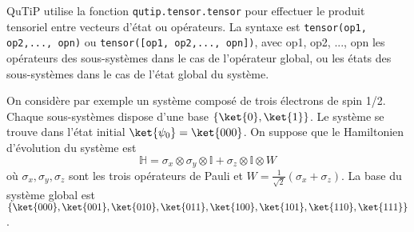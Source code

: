 QuTiP utilise la fonction \texttt{qutip.tensor.tensor} pour effectuer le 
produit tensoriel entre vecteurs d'état ou opérateurs. La syntaxe est 
\texttt{tensor(op1, op2,..., opn)} ou \texttt{tensor([op1, op2,..., opn])}, 
avec op1, op2, ..., opn les opérateurs des sous-systèmes dans le cas 
de l'opérateur global, ou les états des sous-systèmes dans le cas de l'état 
global du système.

On considère par exemple un système composé de trois électrons de spin 1/2. 
Chaque sous-systèmes dispose d'une base $\{\ket{0},\ket{1}\}$. Le système se 
trouve dans l'état initial $\ket{\psi_0}=\ket{000}$. On suppose que le 
Hamiltonien d'évolution du système est 
\begin{equation}
\mathbb{H} = 
\sigma_x\otimes\sigma_y\otimes\mathbb{I}+\sigma_z\otimes\mathbb{I}\otimes W
\end{equation}
où $\sigma_x,\sigma_y,\sigma_z$ sont les trois opérateurs de Pauli et 
$W=\frac{1}{\sqrt{2}}(\sigma_x+\sigma_z)$. La base du système global est 
$\{\ket{000},\ket{001},\ket{010},\ket{011},\ket{100},\ket{101},\ket{110},\ket{
111}\}$.

